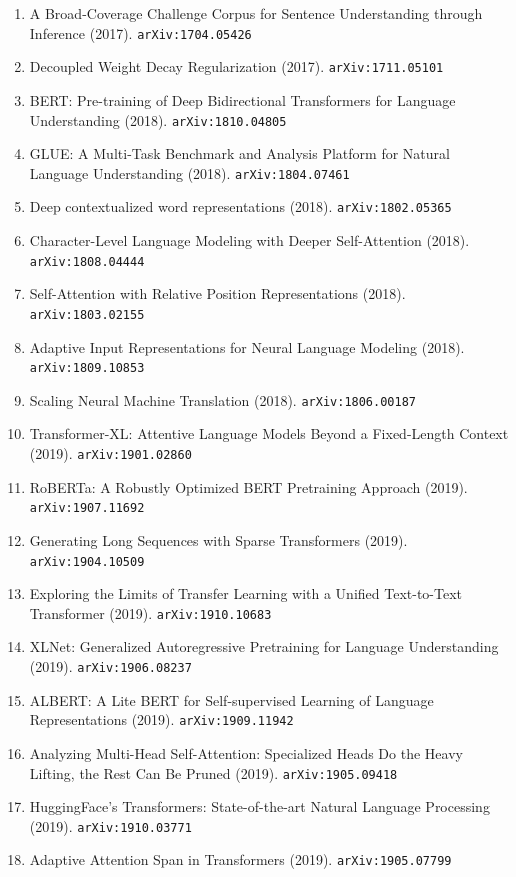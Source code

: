 \documentclass[11pt]{article}
\begin{document}
\begin{enumerate}
  Mixture-of-Experts Layer (2017). \texttt{arXiv:1701.06538}
  \item A Broad-Coverage Challenge Corpus for Sentence Understanding through
  Inference (2017). \texttt{arXiv:1704.05426}
  \item Decoupled Weight Decay Regularization (2017). \texttt{arXiv:1711.05101}
  \item BERT: Pre-training of Deep Bidirectional Transformers for Language
  Understanding (2018). \texttt{arXiv:1810.04805}
  \item GLUE: A Multi-Task Benchmark and Analysis Platform for Natural Language
  Understanding (2018). \texttt{arXiv:1804.07461}
  \item Deep contextualized word representations (2018). \texttt{arXiv:1802.05365}
  \item Character-Level Language Modeling with Deeper Self-Attention (2018). \texttt{arXiv:1808.04444}
  \item Self-Attention with Relative Position Representations (2018). \texttt{arXiv:1803.02155}
  \item Adaptive Input Representations for Neural Language Modeling (2018). \texttt{arXiv:1809.10853}
  \item Scaling Neural Machine Translation (2018). \texttt{arXiv:1806.00187}
  \item Transformer-XL: Attentive Language Models Beyond a Fixed-Length Context (2019). \texttt{arXiv:1901.02860}
  \item RoBERTa: A Robustly Optimized BERT Pretraining Approach (2019). \texttt{arXiv:1907.11692}
  \item Generating Long Sequences with Sparse Transformers (2019). \texttt{arXiv:1904.10509}
  \item Exploring the Limits of Transfer Learning with a Unified Text-to-Text
  Transformer (2019). \texttt{arXiv:1910.10683}
  \item XLNet: Generalized Autoregressive Pretraining for Language Understanding (2019). \texttt{arXiv:1906.08237}
  \item ALBERT: A Lite BERT for Self-supervised Learning of Language
  Representations (2019). \texttt{arXiv:1909.11942}
  \item Analyzing Multi-Head Self-Attention: Specialized Heads Do the Heavy
  Lifting, the Rest Can Be Pruned (2019). \texttt{arXiv:1905.09418}
  \item HuggingFace's Transformers: State-of-the-art Natural Language Processing (2019). \texttt{arXiv:1910.03771}
  \item Adaptive Attention Span in Transformers (2019). \texttt{arXiv:1905.07799}

\end{enumerate}
\end{document}
